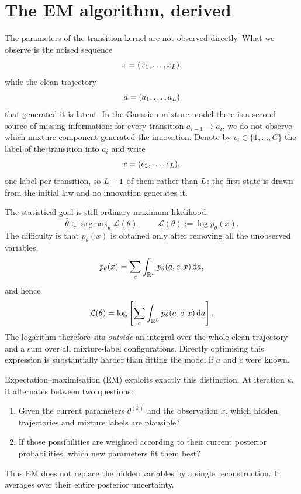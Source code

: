\section{The EM algorithm, derived}\label{sec:em-algorithm}

The parameters of the transition kernel are not observed directly. What we
observe is the noised sequence
\[
  x=(x_1,\ldots,x_{L}),
\]
while the clean trajectory
\[
  a=(a_1,\ldots,a_{L})
\]
that generated it is latent. In the Gaussian-mixture model there is a second
source of missing information: for every transition
$a_{i-1}\to a_i$, we do not observe which mixture component generated the
innovation. Denote by $c_i\in\{1,\ldots,C\}$ the label of the transition into $a_i$ and
write
\[
  c=(c_2,\ldots,c_{L}),
\]
one label per transition, so $L-1$ of them rather than $L$: the
first state is drawn from the initial law and no innovation generates it.

The statistical goal is still ordinary maximum likelihood:
\begin{equation}
  \widehat\theta
  \in
  \operatorname{argmax}_\theta \mathcal L(\theta),
  \qquad
  \mathcal L(\theta)
  :=
  \log p_\theta(x).
  \label{eq:em-objective}
\end{equation}
The difficulty is that $p_\theta(x)$ is obtained only after removing all the
unobserved variables,
\begin{equation}
  p_\theta(x)
  =
  \sum_c
  \int_{\mathbb{R}^{L}}
  p_\theta(a,c,x)\,\mathrm{d} a,
  \label{eq:em-marginalisation}
\end{equation}
and hence
\begin{equation}
  \mathcal L(\theta)
  =
  \log
  \left[
    \sum_c
    \int_{\mathbb{R}^{L}}
    p_\theta(a,c,x)\,\mathrm{d} a
  \right].
  \label{eq:em-marginal-likelihood}
\end{equation}
The logarithm therefore sits \emph{outside} an integral over the whole clean
trajectory and a sum over all mixture-label configurations. Directly
optimising this expression is substantially harder than fitting the model if
$a$ and $c$ were known.

Expectation--maximisation (EM) exploits exactly this distinction. At iteration
$k$, it alternates between two questions:
\begin{enumerate}
  \item[\emph{E-step.}]
  Given the current parameters $\theta^{(k)}$ and the observation $x$, which
  hidden trajectories and mixture labels are plausible?
  \item[\emph{M-step.}]
  If those possibilities are weighted according to their current posterior
  probabilities, which new parameters fit them best?
\end{enumerate}
Thus EM does not replace the hidden variables by a single reconstruction.
It averages over their entire posterior uncertainty.

